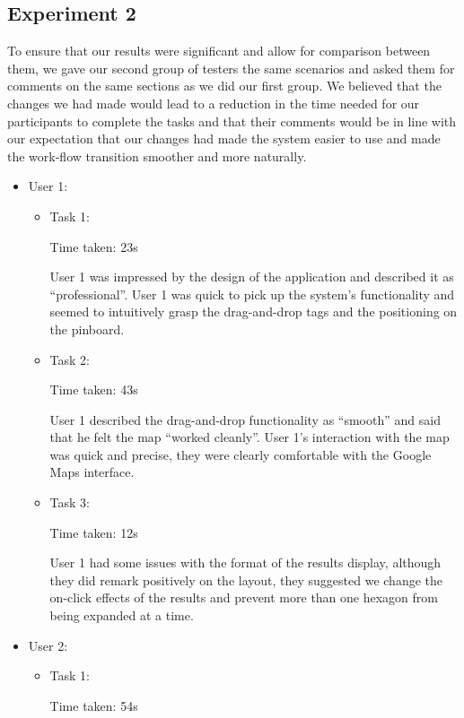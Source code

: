 \documentclass[10pt,a4paper]{article}
\begin{document}
\subsection*{Experiment 2}

To ensure that our results were significant and allow for comparison between them, we gave our second group of testers the same scenarios and asked them for comments on the same sections as we did our first group. We believed that the changes we had made would lead to a reduction in the time needed for our participants to complete the tasks and that their comments would be in line with our expectation that our changes had made the system easier to use and made the work-flow transition smoother and more naturally.

\begin{itemize}

\item{User 1:

\begin{itemize}
\item{Task 1:

Time taken: 23s

User 1 was impressed by the design of the application and described it as “professional”.
User 1 was quick to pick up the system’s functionality and seemed to intuitively grasp the drag-and-drop tags and the positioning on the pinboard.
}

\item{Task 2:

Time taken: 43s

User 1 described the drag-and-drop functionality as “smooth” and said that he felt the map “worked cleanly”.
User 1’s interaction with the map was quick and precise, they were clearly comfortable with the Google Maps interface. 
}
\item{Task 3:

Time taken: 12s

User 1 had some issues with the format of the results display, although they did remark positively on the layout, they suggested we change the on-click effects of the results and prevent more than one hexagon from being expanded at a time.
}
\end{itemize}}

\item{User 2:
\begin{itemize}
\item{Task 1:

Time taken: 54s

}
\end{itemize}}
\end{itemize}
\end{document}
